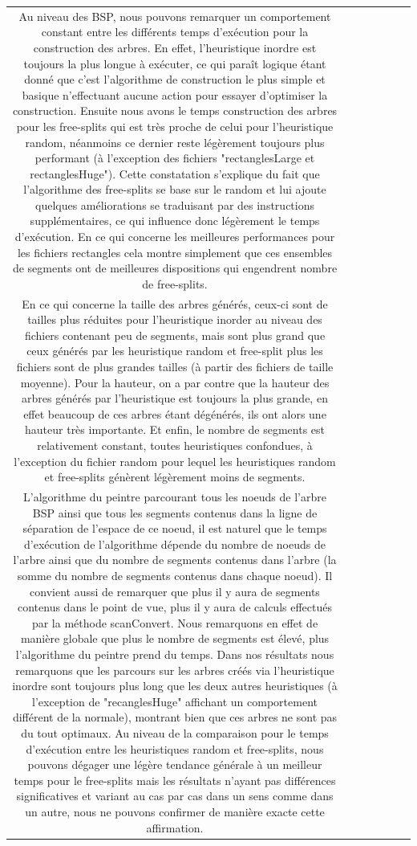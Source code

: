 \documentclass[11pt,a4paper]{article}
\theoremstyle{definition}
\theoremstyle{remark}
\begin{document}
\begin{table}
{\begin{tabular}{|c|c||c|c|c|c|c|}
Au niveau des BSP, nous pouvons remarquer un comportement constant entre les différents temps d'exécution pour la construction des arbres. En effet, l'heuristique inordre est toujours la plus longue à exécuter, ce qui paraît logique étant donné que c'est l'algorithme de construction le plus simple et basique n'effectuant aucune action pour essayer d'optimiser la construction. 
Ensuite nous avons le temps construction des arbres pour les free-splits qui est très proche de celui pour l'heuristique random, néanmoins ce dernier reste légèrement toujours plus performant (à l'exception des fichiers "rectanglesLarge et rectanglesHuge"). Cette constatation s'explique du fait que l'algorithme des free-splits se base sur le random et lui ajoute quelques améliorations se traduisant par des instructions supplémentaires, ce qui influence donc légèrement le temps d'exécution. En ce qui concerne les meilleures performances pour les fichiers rectangles cela montre simplement que ces ensembles de segments ont de meilleures dispositions qui engendrent nombre de free-splits.\\
En ce qui concerne la taille  des arbres générés, ceux-ci sont de tailles plus réduites pour l'heuristique inorder au niveau des fichiers contenant peu de segments, mais sont plus grand que ceux générés par les heuristique random et free-split plus les fichiers sont de plus grandes tailles (à partir des fichiers de taille moyenne). Pour la hauteur, on a par contre que la hauteur des arbres générés par l'heuristique est toujours la plus grande, en effet beaucoup de ces arbres étant dégénérés, ils ont alors une hauteur très importante. Et enfin, le nombre de segments est relativement constant, toutes heuristiques confondues, à l'exception du fichier random pour lequel les heuristiques random et free-splits génèrent légèrement moins de segments. \\

L'algorithme du peintre parcourant tous les noeuds de l'arbre BSP ainsi que tous les segments contenus dans la ligne de séparation de l'espace de ce noeud, il est naturel que le temps d'exécution de l'algorithme dépende du nombre de noeuds de l'arbre ainsi que du nombre de segments contenus dans l'arbre (la somme du nombre de segments contenus dans chaque noeud). Il convient aussi de remarquer que plus il y aura de segments contenus dans le point de vue, plus il y aura de calculs effectués par la méthode scanConvert. Nous remarquons en effet de manière globale que plus le nombre de segments est élevé, plus l'algorithme du peintre prend du temps. Dans nos résultats nous remarquons que les parcours sur les arbres créés via l'heuristique inordre sont toujours plus long que les deux autres heuristiques (à l'exception de "recanglesHuge" affichant un comportement différent de la normale), montrant bien que ces arbres ne sont pas du tout optimaux. Au niveau de la comparaison pour le temps d'exécution entre les heuristiques random et free-splits, nous pouvons dégager une légère tendance générale à un meilleur temps pour le free-splits mais les résultats n'ayant pas différences significatives et variant au cas par cas dans un sens comme dans un autre, nous ne pouvons confirmer de manière exacte cette affirmation.
  

\end{tabular}}
\end{table}
\end{document}
